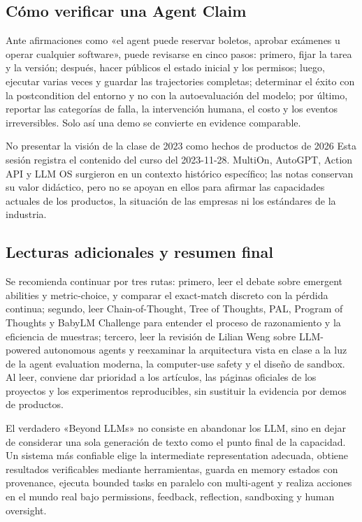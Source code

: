 \subsection{Cómo verificar una Agent Claim}

Ante afirmaciones como «el agent puede reservar boletos, aprobar exámenes u operar cualquier software», puede revisarse en cinco pasos: primero, fijar la tarea y la versión; después, hacer públicos el estado inicial y los permisos; luego, ejecutar varias veces y guardar las trajectories completas; determinar el éxito con la postcondition del entorno y no con la autoevaluación del modelo; por último, reportar las categorías de falla, la intervención humana, el costo y los eventos irreversibles. Solo así una demo se convierte en evidence comparable.

\begin{warningbox}{No presentar la visión de la clase de 2023 como hechos de productos de 2026}
Esta sesión registra el contenido del curso del 2023-11-28. MultiOn, AutoGPT, Action API y LLM OS surgieron en un contexto histórico específico; las notas conservan su valor didáctico, pero no se apoyan en ellos para afirmar las capacidades actuales de los productos, la situación de las empresas ni los estándares de la industria.
\end{warningbox}

\subsection{Lecturas adicionales y resumen final}

\enlargethispage{5\baselineskip}

Se recomienda continuar por tres rutas: primero, leer el debate sobre emergent abilities y metric-choice, y comparar el exact-match discreto con la pérdida continua; segundo, leer Chain-of-Thought, Tree of Thoughts, PAL, Program of Thoughts y BabyLM Challenge para entender el proceso de razonamiento y la eficiencia de muestras; tercero, leer la revisión de Lilian Weng sobre LLM-powered autonomous agents y reexaminar la arquitectura vista en clase a la luz de la agent evaluation moderna, la computer-use safety y el diseño de sandbox. Al leer, conviene dar prioridad a los artículos, las páginas oficiales de los proyectos y los experimentos reproducibles, sin sustituir la evidencia por demos de productos.

El verdadero «Beyond LLMs» no consiste en abandonar los LLM, sino en dejar de considerar una sola generación de texto como el punto final de la capacidad. Un sistema más confiable elige la intermediate representation adecuada, obtiene resultados verificables mediante herramientas, guarda en memory estados con provenance, ejecuta bounded tasks en paralelo con multi-agent y realiza acciones en el mundo real bajo permissions, feedback, reflection, sandboxing y human oversight.


